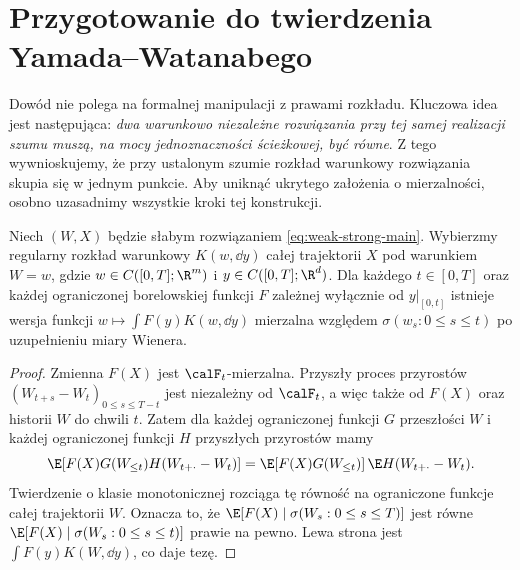 \section{Przygotowanie do twierdzenia Yamada--Watanabego}

Dowód nie polega na formalnej manipulacji z prawami
rozkładu. Kluczowa idea jest następująca: \emph{dwa
warunkowo niezależne rozwiązania przy tej samej realizacji
szumu muszą, na mocy jednoznaczności ścieżkowej, być równe}.
Z tego wywnioskujemy, że przy ustalonym szumie rozkład
warunkowy rozwiązania skupia się w jednym punkcie.
Aby uniknąć ukrytego założenia o mierzalności, osobno
uzasadnimy wszystkie kroki tej konstrukcji.

\begin{lemat}
\label{lem:YW-causality}
Niech $(W,X)$ będzie słabym rozwiązaniem
\eqref{eq:weak-strong-main}. Wybierzmy regularny rozkład
warunkowy $K(w,\dd y)$ całej trajektorii $X$ pod warunkiem
$W=w$, gdzie $w\in C([0,T];\R^m)$ i
$y\in C([0,T];\R^d)$. Dla każdego $t\in[0,T]$ oraz
każdej ograniczonej borelowskiej funkcji $F$ zależnej
wyłącznie od $y|_{[0,t]}$ istnieje wersja funkcji
$w\mapsto\int F(y)K(w,\dd y)$ mierzalna względem
$\sigma(w_s:0\le s\le t)$ po uzupełnieniu miary Wienera.
\end{lemat}
\begin{proof}
Zmienna $F(X)$ jest $\calF_t$-mierzalna.
Przyszły proces przyrostów $(W_{t+s}-W_t)_{0\le s\le T-t}$
jest niezależny od $\calF_t$, a więc także od $F(X)$
oraz historii $W$ do chwili $t$. Zatem dla każdej ograniczonej
funkcji $G$ przeszłości $W$ i każdej ograniczonej funkcji $H$
przyszłych przyrostów mamy
\[
 \E[F(X)G(W_{\le t})H(W_{t+\cdot}-W_t)]
 =\E[F(X)G(W_{\le t})]\,\E H(W_{t+\cdot}-W_t).
\]
Twierdzenie o klasie monotonicznej rozciąga tę równość
na ograniczone funkcje całej trajektorii $W$. Oznacza to,
że $\E[F(X)\mid\sigma(W_s:0\le s\le T)]$ jest równe
$\E[F(X)\mid\sigma(W_s:0\le s\le t)]$ prawie na pewno.
Lewa strona jest $\int F(y)K(W,\dd y)$, co daje tezę.
\end{proof}

